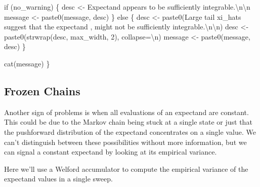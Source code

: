 \documentclass[
  letterpaper,
  DIV=11,
  numbers=noendperiod]{scrartcl}
\newenvironment{Shaded}{\begin{snugshade}}{\end{snugshade}}
\newcommand{\AttributeTok}[1]{\textcolor[rgb]{0.40,0.45,0.13}{#1}}
\newcommand{\ControlFlowTok}[1]{\textcolor[rgb]{0.00,0.23,0.31}{#1}}
\newcommand{\DecValTok}[1]{\textcolor[rgb]{0.68,0.00,0.00}{#1}}
\newcommand{\FunctionTok}[1]{\textcolor[rgb]{0.28,0.35,0.67}{#1}}
\newcommand{\NormalTok}[1]{\textcolor[rgb]{0.00,0.23,0.31}{#1}}
\newcommand{\OtherTok}[1]{\textcolor[rgb]{0.00,0.23,0.31}{#1}}
\newcommand{\SpecialCharTok}[1]{\textcolor[rgb]{0.37,0.37,0.37}{#1}}
\newcommand{\StringTok}[1]{\textcolor[rgb]{0.13,0.47,0.30}{#1}}
\begin{document}
\begin{Shaded}
\begin{Highlighting}[]
  \ControlFlowTok{if}\NormalTok{ (no\_warning) \{}
\NormalTok{    desc }\OtherTok{\textless{}{-}} \StringTok{\textquotesingle{}Expectand appears to be sufficiently integrable.}\SpecialCharTok{\textbackslash{}n\textbackslash{}n}\StringTok{\textquotesingle{}}
\NormalTok{    message }\OtherTok{\textless{}{-}} \FunctionTok{paste0}\NormalTok{(message, desc)}
\NormalTok{  \} }\ControlFlowTok{else}\NormalTok{ \{}
\NormalTok{    desc }\OtherTok{\textless{}{-}} \FunctionTok{paste0}\NormalTok{(}\StringTok{\textquotesingle{}Large tail xi\_hats suggest that the expectand \textquotesingle{}}\NormalTok{,}
                   \StringTok{\textquotesingle{}might not be sufficiently integrable.}\SpecialCharTok{\textbackslash{}n\textbackslash{}n}\StringTok{\textquotesingle{}}\NormalTok{)}
\NormalTok{    desc }\OtherTok{\textless{}{-}} \FunctionTok{paste0}\NormalTok{(}\FunctionTok{strwrap}\NormalTok{(desc, max\_width, }\DecValTok{2}\NormalTok{), }\AttributeTok{collapse=}\StringTok{\textquotesingle{}}\SpecialCharTok{\textbackslash{}n}\StringTok{\textquotesingle{}}\NormalTok{)}
\NormalTok{    message }\OtherTok{\textless{}{-}} \FunctionTok{paste0}\NormalTok{(message, desc)}
\NormalTok{  \}}
  
  \FunctionTok{cat}\NormalTok{(message)}
\NormalTok{\}}
\end{Highlighting}
\end{Shaded}

\hypertarget{frozen-chains}{%
\subsection{Frozen Chains}\label{frozen-chains}}

Another sign of problems is when all evaluations of an expectand are
constant. This could be due to the Markov chain being stuck at a single
state or just that the pushforward distribution of the expectand
concentrates on a single value. We can't distinguish between these
possibilities without more information, but we can signal a constant
expectand by looking at its empirical variance.

Here we'll use a Welford accumulator to compute the empirical variance
of the expectand values in a single sweep.
\end{document}
